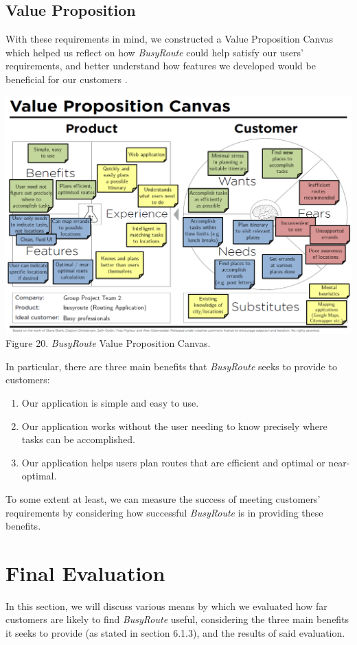 \documentclass[a4paper, 10pt]{report}
\begin{document}
\subsection{Value Proposition}
With these requirements in mind, we constructed a Value Proposition Canvas which helped us reflect on how \textit{BusyRoute} could help satisfy our users' requirements, and better understand how features we developed would be beneficial for our customers \cite{vpc}.
\begin{center}
\includegraphics[scale=0.5]{vpc.png} \\
Figure 20. \textit{BusyRoute} Value Proposition Canvas.
\end{center}
In particular, there are three main benefits that \textit{BusyRoute} seeks to provide to customers:
\begin{enumerate}
\item Our application is simple and easy to use.
\item Our application works without the user needing to know precisely where tasks can be accomplished.
\item Our application helps users plan routes that are efficient and optimal or near-optimal.
\end{enumerate}
To some extent at least, we can measure the success of meeting customers' requirements by considering how successful \textit{BusyRoute} is in providing these benefits.

\section{Final Evaluation}
In this section, we will discuss various means by which we evaluated how far customers are likely to find \textit{BusyRoute} useful, considering the three main benefits it seeks to provide (as stated in section 6.1.3), and the results of said evaluation.
\end{document}
